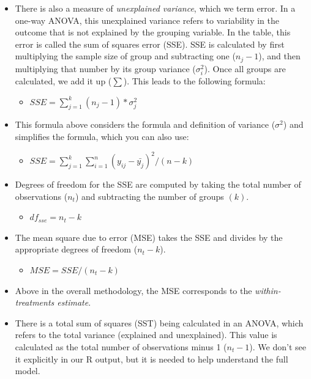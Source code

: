 \documentclass[
  letterpaper,
  DIV=11,
  numbers=noendperiod]{scrreprt}
\providecommand{\tightlist}{%
  \setlength{\itemsep}{0pt}\setlength{\parskip}{0pt}}\usepackage{longtable,booktabs,array}
\begin{document}
\begin{itemize}
\item
  There is also a measure of \emph{unexplained variance}, which we term
  error. In a one-way ANOVA, this unexplained variance refers to
  variability in the outcome that is not explained by the grouping
  variable. In the table, this error is called the sum of squares error
  (SSE). SSE is calculated by first multiplying the sample size of group
  and subtracting one (\(n_j-1\)), and then multiplying that number by
  its group variance (\(\sigma^2_i\)). Once all groups are calculated,
  we add it up (\(\sum\)). This leads to the following formula:

  \begin{itemize}
  \tightlist
  \item
    \(SSE = \sum^k_{j=1}{(n_j-1)*\sigma^2_j}\)
  \end{itemize}
\item
  This formula above considers the formula and definition of variance
  (\(\sigma^2\)) and simplifies the formula, which you can also use:

  \begin{itemize}
  \tightlist
  \item
    \(SSE = \sum^k_{j=1}\sum^n_{i=1}(y_{ij}-\bar{y_j})^2/(n-k)\)
  \end{itemize}
\item
  Degrees of freedom for the SSE are computed by taking the total number
  of observations (\(n_t\)) and subtracting the number of groups
  \((k)\).

  \begin{itemize}
  \tightlist
  \item
    \(df_{sse} = n_t-k\)
  \end{itemize}
\item
  The mean square due to error (MSE) takes the SSE and divides by the
  appropriate degrees of freedom (\(n_t-k\)).

  \begin{itemize}
  \tightlist
  \item
    \(MSE = SSE/(n_t-k)\)
  \end{itemize}
\item
  Above in the overall methodology, the MSE corresponds to the
  \emph{within-treatments estimate}.
\item
  There is a total sum of squares (SST) being calculated in an ANOVA,
  which refers to the total variance (explained and unexplained). This
  value is calculated as the total number of observations minus 1
  (\(n_t-1\)). We don't see it explicitly in our R output, but it is
  needed to help understand the full model.
\end{itemize}
\end{document}
